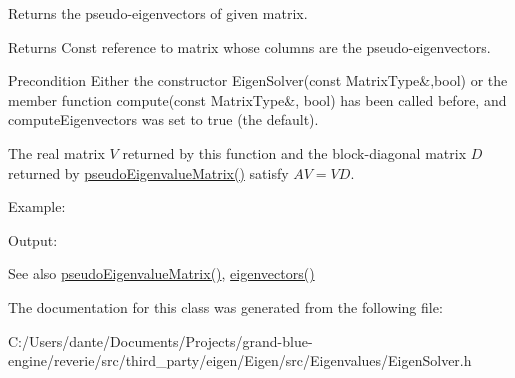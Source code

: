 Returns the pseudo-\/eigenvectors of given matrix. 

\begin{DoxyReturn}{Returns}
Const reference to matrix whose columns are the pseudo-\/eigenvectors.
\end{DoxyReturn}
\begin{DoxyPrecond}{Precondition}
Either the constructor Eigen\+Solver(const Matrix\+Type\&,bool) or the member function compute(const Matrix\+Type\&, bool) has been called before, and {\ttfamily compute\+Eigenvectors} was set to true (the default).
\end{DoxyPrecond}
The real matrix $ V $ returned by this function and the block-\/diagonal matrix $ D $ returned by \mbox{\hyperlink{class_eigen_1_1_eigen_solver_a4979eafe0aeef06b19ada7fa5e19db17}{pseudo\+Eigenvalue\+Matrix()}} satisfy $ AV = VD $.

Example\+: 
\begin{DoxyCodeInclude}{0}
\end{DoxyCodeInclude}
 Output\+: 
\begin{DoxyVerbInclude}
\end{DoxyVerbInclude}


\begin{DoxySeeAlso}{See also}
\mbox{\hyperlink{class_eigen_1_1_eigen_solver_a4979eafe0aeef06b19ada7fa5e19db17}{pseudo\+Eigenvalue\+Matrix()}}, \mbox{\hyperlink{class_eigen_1_1_eigen_solver_a66288022802172e3ee059283b26201d7}{eigenvectors()}} 
\end{DoxySeeAlso}


The documentation for this class was generated from the following file\+:\begin{DoxyCompactItemize}
\item 
C\+:/\+Users/dante/\+Documents/\+Projects/grand-\/blue-\/engine/reverie/src/third\+\_\+party/eigen/\+Eigen/src/\+Eigenvalues/Eigen\+Solver.\+h\end{DoxyCompactItemize}
